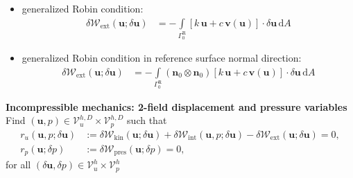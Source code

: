 \documentclass[a4paper,12pt]{report}
\newcommand{\Gm}{\mathit{\Gamma}}
\begin{document}
\begin{itemize}
\item generalized Robin condition:
\begin{equation}
\label{equation-deltaw-ext-robin}
\begin{aligned}
\delta \mathcal{W}_{\mathrm{ext}}(\boldsymbol{u};\delta\boldsymbol{u}) &= -\int\limits_{\Gm_{0}^{\mathrm{R}}} \left[k\,\boldsymbol{u} + c\,\boldsymbol{v}(\boldsymbol{u})\right] \cdot \delta\boldsymbol{u}\,\mathrm{d}A
\end{aligned}
\end{equation}
\item generalized Robin condition in reference surface normal direction:
\begin{equation}
\label{equation-deltaw-ext-robin-n}
\begin{aligned}
\delta \mathcal{W}_{\mathrm{ext}}(\boldsymbol{u};\delta\boldsymbol{u}) &= -\int\limits_{\Gm_{0}^{\mathrm{R}}} (\boldsymbol{n}_0 \otimes \boldsymbol{n}_0)\left[k\,\boldsymbol{u} + c\,\boldsymbol{v}(\boldsymbol{u})\right] \cdot \delta\boldsymbol{u}\,\mathrm{d}A
\end{aligned}
\end{equation}

\end{itemize}

\textbf{Incompressible mechanics: 2-field displacement and pressure variables}\\

Find $(\boldsymbol{u},p) \in \boldsymbol{\mathcal{V}}_{u}^{h,D} \times \mathcal{V}_{p}^{h,D}$ such that
\begin{equation}
\label{equation-solid-weak-form-inc}
\begin{aligned}
r_u(\boldsymbol{u},p;\delta\boldsymbol{u}) &:= \delta \mathcal{W}_{\mathrm{kin}}(\boldsymbol{u};\delta\boldsymbol{u}) + \delta \mathcal{W}_{\mathrm{int}}(\boldsymbol{u},p;\delta\boldsymbol{u}) - \delta \mathcal{W}_{\mathrm{ext}}(\boldsymbol{u};\delta\boldsymbol{u}) = 0, \\
r_p(\boldsymbol{u};\delta p) &:= \delta \mathcal{W}_{\mathrm{pres}}(\boldsymbol{u};\delta p) = 0,
\end{aligned}
\end{equation}
for all $(\delta\boldsymbol{u},\delta p) \in \boldsymbol{\mathcal{V}}_{u}^{h} \times \mathcal{V}_{p}^{h}$\\
\end{document}
